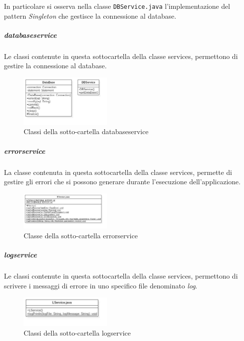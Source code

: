 	In particolare si osserva nella classe \texttt{DBService.java} l'implementazione del pattern \emph{Singleton} che gestisce la connessione al database.
	
	\subparagraph{databaseservice}
	Le classi contenute in questa sottocartella della classe services, permettono di gestire la connessione al database.
	
	\begin{figure}[h]
		\centering
		\includegraphics[width=0.4\textwidth]
		{immagini/c-databaseservice}
		
		\caption{Classi della sotto-cartella databaseservice}
	\end{figure}
	
	
	\subparagraph{errorservice}
	La classe contenuta in questa sottocartella della classe services, permette di gestire gli errori che si possono generare durante l'esecuzione dell'applicazione.
	
	\begin{figure}[h]
		\centering
		\includegraphics[width=0.4\textwidth]
		{immagini/c-errorservice}
		
		\caption{Classe della sotto-cartella errorservice}
	\end{figure}
	
	
	\subparagraph{logservice}
	Le classi contenute in questa sottocartella della classe services, permettono di scrivere i messaggi di errore in uno specifico file denominato \emph{log}.
	
	\begin{figure}[h]
		\centering
		\includegraphics[width=0.4\textwidth]
		{immagini/c-logservice}
		
		\caption{Classi della sotto-cartella logservice}
	\end{figure}
	
